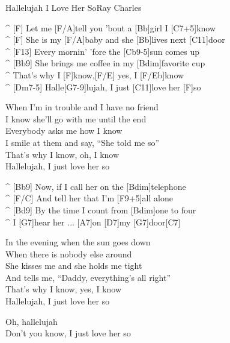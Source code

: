 \begin{song}{Hallelujah I Love Her So}{Ray Charles}

\begin{guitar}
^ [F]  Let me [F/A]tell you 'bout a [Bb]girl I [C7+5]know\\
^ [F]  She is my [F/A]baby and she [Bb]lives next [C11]door\\
^ [F13]  Every mornin' 'fore the [Cb9-5]sun comes up\\
^ [Bb9]  She brings me coffee in my [Bdim]favorite cup\\
^ That's why I [F]know,[F/E] yes, I [F/Eb]know\\
^ [Dm7-5] Halle[G7-9]lujah, I just [C11]love her [F]so\\
\end{guitar}

\begin{guitar}
When I'm in trouble and I have no friend\\
I know she'll go with me until the end\\
Everybody asks me how I know\\
I smile at them and say, “She told me so”\\
That's why I know, oh, I know\\
Hallelujah, I just love her so\\
\end{guitar}

\begin{guitar}
^ [Bb9] Now, if I call her on the [Bdim]telephone\\
^ [F/C] And tell her that I'm [F9+5]all alone\\
^ [Bd9] By the time I count from [Bdim]one to four\\
^ I [G7]hear her ... [A7]on [D7]my [G7]door[C7]\\
\end{guitar}

\begin{guitar}
In the evening when the sun goes down\\
When there is nobody else around\\
She kisses me and she holds me tight\\
And tells me, “Daddy, everything's all right”\\
That's why I know, yes, I know\\
Hallelujah, I just love her so\\
\end{guitar}



\begin{guitar}
Oh, hallelujah\\
Don't you know, I just love her so\\
\end{guitar}
\end{song}
